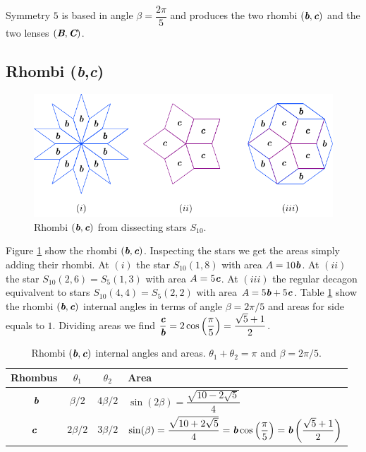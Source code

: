 \documentclass[11pt]{article}
\def\mathbi#1{\textbf{\em #1}}
\begin{document}
Symmetry $5$ is based in angle $\beta = \dfrac{2\pi}5$ and produces the two rhombi $(\mathbi{b},\mathbi{c})$ and the two lenses $(\mathbi{B},\mathbi{C})$.

\subsection{Rhombi (\mathbi{b},\mathbi{c})}

\begin{figure}[H]
\centering
\includegraphics[scale=1.1]{bc/rhombi}
\caption{Rhombi $(\mathbi{b},\mathbi{c})$ from dissecting stars $S_{10}$.}
\label{fig:bc-rhombi}
\end{figure}

Figure \ref{fig:bc-rhombi} show the rhombi $(\mathbi{b},\mathbi{c})$. 
Inspecting the stars we get the areas simply adding their rhombi.
At $(i)$ the star $S_{10}(1,8)$ with area $A = 10\mathbi{b}$.
At $(ii)$ the star $S_{10}(2,6) = S_5(1,3)$ with area $A = 5\mathbi{c}$.
At $(iii)$ the regular decagon equivalvent to stars $S_{10}(4,4) = S_5(2,2)$ with area $A = 5\mathbi{b} + 5\mathbi{c}$. 
Table \ref {tbl:bc-angles} show the rhombi $(\mathbi{b},\mathbi{c})$ internal angles in terms of angle $\beta = 2\pi/5$ and areas for side equals to $1$. Dividing areas we find $\dfrac{\mathbi{c}}{\mathbi{b}} = 2\cos\left(\dfrac{\pi}5\right) = \dfrac{\sqrt5 + 1}2$.

\begin{table}[H]
\begin{center}
\begin{tabular}{|c|c c| l |}
\hline
Rhombus & $\theta_1$ & $\theta_2$ & Area \\ \hline\
$\mathbi{b}$ & $\beta/2$ & $4\beta/2$ & $\sin(2\beta) = \dfrac{\sqrt{10-2\sqrt5}}4 $
\\[1.2ex] \hline
$\mathbi{c}$ & $2\beta/2$ & $3\beta/2$ & 
$\sin(\beta) = \dfrac{\sqrt{10+2\sqrt5}}4 
= \mathbi{b}\cos\left(\dfrac{\pi}5\right) = \mathbi{b}\left(\dfrac{\sqrt5+1}2\right)$
\\[1.2ex] \hline
\end{tabular}
\caption{Rhombi $(\mathbi{b},\mathbi{c})$ internal angles and areas. $\theta_1 + \theta_2 = \pi$ and $\beta = 2\pi/5$.} 
\label{tbl:bc-angles}
\end{center}
\end{table}
\end{document}
